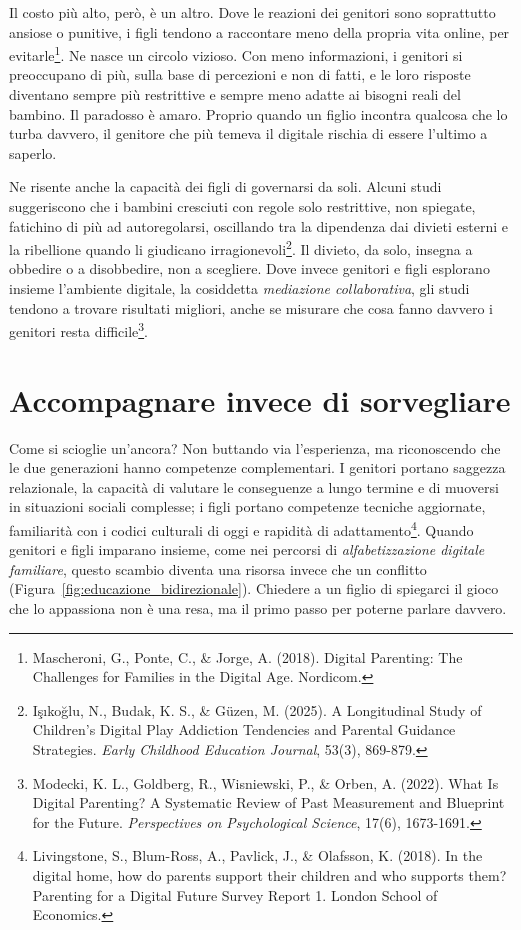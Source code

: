 Il costo più alto, però, è un altro. Dove le reazioni dei genitori sono soprattutto ansiose o punitive, i figli tendono a raccontare meno della propria vita online, per evitarle\footnote{Mascheroni, G., Ponte, C., \& Jorge, A. (2018). Digital Parenting: The Challenges for Families in the Digital Age. Nordicom.}. Ne nasce un circolo vizioso. Con meno informazioni, i genitori si preoccupano di più, sulla base di percezioni e non di fatti, e le loro risposte diventano sempre più restrittive e sempre meno adatte ai bisogni reali del bambino. Il paradosso è amaro. Proprio quando un figlio incontra qualcosa che lo turba davvero, il genitore che più temeva il digitale rischia di essere l'ultimo a saperlo.

Ne risente anche la capacità dei figli di governarsi da soli. Alcuni studi suggeriscono che i bambini cresciuti con regole solo restrittive, non spiegate, fatichino di più ad autoregolarsi, oscillando tra la dipendenza dai divieti esterni e la ribellione quando li giudicano irragionevoli\footnote{Işıkoğlu, N., Budak, K. S., \& Güzen, M. (2025). A Longitudinal Study of Children's Digital Play Addiction Tendencies and Parental Guidance Strategies. \textit{Early Childhood Education Journal}, 53(3), 869-879.}. Il divieto, da solo, insegna a obbedire o a disobbedire, non a scegliere. Dove invece genitori e figli esplorano insieme l'ambiente digitale, la cosiddetta \textit{mediazione collaborativa}, gli studi tendono a trovare risultati migliori, anche se misurare che cosa fanno davvero i genitori resta difficile\footnote{Modecki, K. L., Goldberg, R., Wisniewski, P., \& Orben, A. (2022). What Is Digital Parenting? A Systematic Review of Past Measurement and Blueprint for the Future. \textit{Perspectives on Psychological Science}, 17(6), 1673-1691.}.

\section{Accompagnare invece di sorvegliare}

Come si scioglie un'ancora? Non buttando via l'esperienza, ma riconoscendo che le due generazioni hanno competenze complementari. I genitori portano saggezza relazionale, la capacità di valutare le conseguenze a lungo termine e di muoversi in situazioni sociali complesse; i figli portano competenze tecniche aggiornate, familiarità con i codici culturali di oggi e rapidità di adattamento\footnote{Livingstone, S., Blum-Ross, A., Pavlick, J., \& Olafsson, K. (2018). In the digital home, how do parents support their children and who supports them? Parenting for a Digital Future Survey Report 1. London School of Economics.}. Quando genitori e figli imparano insieme, come nei percorsi di \textit{alfabetizzazione digitale familiare}, questo scambio diventa una risorsa invece che un conflitto (Figura~\ref{fig:educazione_bidirezionale}). Chiedere a un figlio di spiegarci il gioco che lo appassiona non è una resa, ma il primo passo per poterne parlare davvero.

